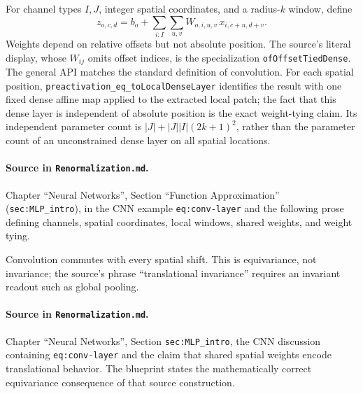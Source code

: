 \begin{definition}
\label{def:renorm:conv2d}
For channel types $I,J$, integer spatial coordinates, and a radius-$k$ window, define
\[
 z_{o,c,d}=b_o+\sum_{i:I}\sum_{u,v}
   W_{o,i,u,v}\,x_{i,c+u,d+v}.
\]
Weights depend on relative offsets but not absolute position.  The source's literal display,
whose $W_{ij}$ omits offset indices, is the specialization
\texttt{ofOffsetTiedDense}.  The general API matches the standard definition of convolution.
For each spatial position, \texttt{preactivation\_eq\_toLocalDenseLayer} identifies the result with
one fixed dense affine map applied to the extracted local patch; the fact that this dense layer is
independent of absolute position is the exact weight-tying claim.
Its independent parameter count is
$|J|+|J||I|(2k+1)^2$, rather than the parameter count of an unconstrained dense layer on all spatial
locations.

\paragraph{Source in \texttt{Renormalization.md}.}
Chapter ``Neural Networks'', Section ``Function Approximation'' (\texttt{sec:MLP\_intro}), in the CNN
example \texttt{eq:conv-layer} and the following prose defining channels, spatial coordinates,
local windows, shared weights, and weight tying.
\end{definition}

\begin{theorem}
\label{thm:renorm:convEquivariant}
Convolution commutes with every spatial shift.  This is equivariance, not invariance; the source's
phrase ``translational invariance'' requires an invariant readout such as global pooling.

\paragraph{Source in \texttt{Renormalization.md}.}
Chapter ``Neural Networks'', Section \texttt{sec:MLP\_intro}, the CNN discussion containing
\texttt{eq:conv-layer} and the claim that shared spatial weights encode translational behavior.  The
blueprint states the mathematically correct equivariance consequence of that source construction.
\end{theorem}

